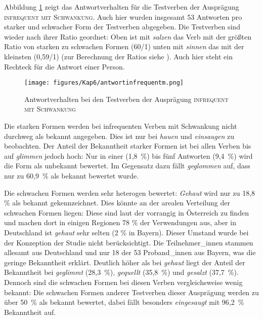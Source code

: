 Abbildung \ref{freqantwortmit} zeigt das Antwortverhalten für die Testverben der Ausprägung \textsc{infrequent mit Schwankung}. Auch hier wurden insgesamt 53 Antworten pro starker und schwacher Form der Testverben abgegeben. Die Testverben sind wieder nach ihrer Ratio geordnet: Oben ist mit \textit{salzen} das Verb mit der größten Ratio von starken zu schwachen Formen (60/1) unten mit \textit{sinnen} das mit der kleinsten (0,59/1) (zur Berechnung der Ratios siehe ).  Auch hier steht ein Rechteck für die Antwort einer Person.

\begin{figure}
\texttt{[image: figures/Kap6/antwortinfrequentm.png]} 
\caption{Antwortverhalten bei den Testverben der Ausprägung \textsc{infrequent mit Schwankung}}
\label{freqantwortmit}
\end{figure}

Die starken Formen werden bei infrequenten Verben mit Schwankung nicht durchweg als bekannt angegeben. Dies ist nur bei \textit{hauen} und \textit{einsaugen} zu beobachten. Der Anteil der Bekanntheit starker Formen ist bei allen Verben bis auf \textit{glimmen} jedoch hoch: Nur in einer (1,8~\%) bis fünf Antworten  (9,4~\%) wird die Form als unbekannt bewertet. Im Gegensatz dazu fällt \textit{geglommen} auf, dass nur zu 60,9~\% als bekannt bewertet wurde. 



Die schwachen Formen werden sehr heterogen bewertet: \textit{Gehaut} wird nur zu 18,8 \% als bekannt gekennzeichnet. Dies könnte an der arealen Verteilung der schwachen Formen liegen: Diese sind laut der \textcite{VariantengrammatikdesStandarddeutschen.2018b} vorrangig in Österreich zu finden und machen dort in einigen Regionen 78 \% der Verwendungen aus, aber in Deutschland ist \textit{gehaut} sehr selten (2 \% in Bayern). Dieser Umstand wurde bei der Konzeption der Studie nicht berücksichtigt. Die Teilnehmer\_innen stammen allesamt aus Deutschland und nur 18 der 53 Proband\_innen aus Bayern, was die geringe Bekanntheit erklärt. Deutlich höher als bei \textit{gehaut} liegt der Anteil der Bekanntheit bei \textit{geglimmt} (28,3~\%), \textit{gequellt} (35,8~\%) und \textit{gesalzt} (37,7~\%). Dennoch sind die schwachen Formen bei diesen Verben vergleichsweise wenig bekannt: Die schwachen Formen anderer Testverben dieser Ausprägung werden zu über 50~\% als bekannt bewertet, dabei fällt besonders \textit{eingesaugt} mit 96,2~\% Bekanntheit auf.


